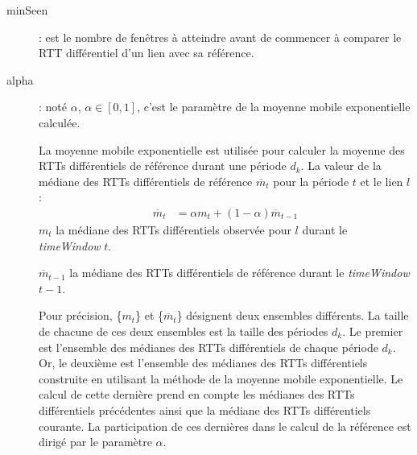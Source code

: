 \begin{description}
\item[minSeen] : est le nombre de fenêtres à atteindre avant de commencer à comparer le RTT différentiel d'un lien avec sa référence.

\item[alpha ]: noté $\alpha$,  $\alpha \in [0, 1]$, c'est le paramètre de la  moyenne mobile exponentielle calculée.

La  moyenne mobile exponentielle est utilisée pour calculer la moyenne des RTTs différentiels de référence durant une période $d_k$.
La  valeur de la médiane des RTTs différentiels de référence $ \overline{m}_{t}$   pour la période $ t $ et  le lien $l$ :
\begin{align*}
	 \overline{m}_{t} &=  \alpha{m}_{t} + (1 -  \alpha)  \overline{m}_{t-1}
\end{align*} 
$m_t$ la médiane des RTTs différentiels observée pour $l$ durant le \textit{timeWindow} $t$. 

$ \overline{m}_{t-1}$  la médiane des  RTTs différentiels  de référence durant le \textit{timeWindow} $ t-1 $.  



Pour précision, \{$m_t$\} et \{$ \overline{m}_{t}$\} désignent deux ensembles différents. La taille de chacune de ces deux ensembles est la taille des périodes $d_k$.  Le premier est l'ensemble des médianes des RTTs différentiels de chaque période $d_k$. Or, le deuxième est l'ensemble des médianes des RTTs différentiels construite en utilisant la méthode de la moyenne mobile exponentielle. Le calcul de cette dernière prend en compte les médianes des RTTs différentiels précédentes ainsi que la médiane des RTTs différentiels courante. La participation de ces dernières dans le calcul de la référence est dirigé par le paramètre $\alpha$. 




\end{description}
